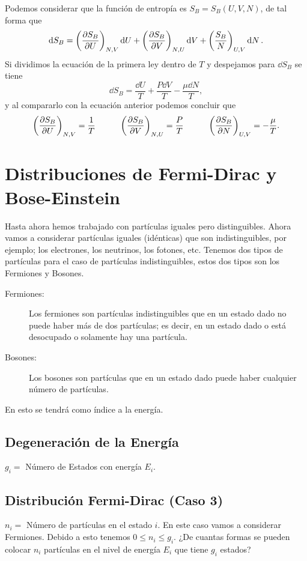 Podemos considerar que la función de entropía es $S_B = S_B (U,V,N)$, de tal forma que
	$$ \dd{S_B} = \qty(\pdv{S_B}{U})_{N,V} \dd{U} + \qty(\pdv{S_B}{V})_{N,U} \dd{V} + \qty(\frac{S_B}{N})_{U,V} \dd{N}. $$
Si dividimos la ecuación de la primera ley dentro de $T$ y despejamos para $\dd{S_B}$ se tiene
	$$ \dd{S_B} = \frac{\dd{U}}{T} + \frac{P\dd{V}}{T} - \frac{\mu \dd{N}}{T}, $$
y al compararlo con la ecuación anterior podemos concluir que
	$$ \qty(\pdv{S_B}{U})_{N,V} = \frac{1}{T} \quad \qquad \qty(\pdv{S_B}{V})_{N,U} = \frac{P}{T} \quad \qquad \qty(\pdv{S_B}{N})_{U,V} = -\frac{\mu}{T}. $$
	
	


\chapter{Distribuciones de Fermi-Dirac y Bose-Einstein}
Hasta ahora hemos trabajado con partículas iguales pero distinguibles. Ahora vamos a considerar partículas iguales (idénticas) que son indistinguibles, por ejemplo; los electrones, los neutrinos, los fotones, etc. Tenemos dos tipos de partículas para el caso de partículas indistinguibles, estos dos tipos son los Fermiones y Bosones.

\begin{description}
	\item[Fermiones: ] Los fermiones son partículas indistinguibles que en un estado dado no puede haber más de dos partículas; es decir, en un estado dado o está desocupado o solamente hay una partícula.
	\item[Bosones: ] Los bosones son partículas que en un estado dado puede haber cualquier número de partículas.
\end{description}

En esto se tendrá como índice a la energía.

\section{Degeneración de la Energía}
\begin{tcolorbox}
	$g_i = $ Número de Estados con energía $E_i$.
\end{tcolorbox}


\section{Distribución Fermi-Dirac (Caso 3)}
$n_i = $ Número de partículas en el estado $i$. En este caso vamos a considerar Fermiones. Debido a esto tenemos $0 \leq n_i \leq g_i$. ¿De cuantas formas se pueden colocar $n_i$ partículas en el nivel de energía $E_i$ que tiene $g_i$ estados? \\


